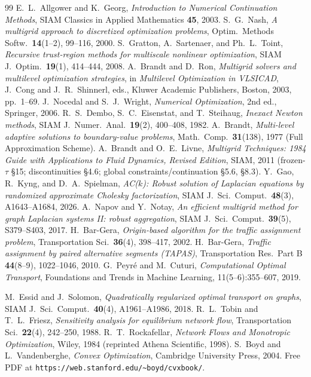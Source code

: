 \documentclass{siamart220329}
\begin{document}
\begin{thebibliography}{99}
 E.~L.~Allgower and K.~Georg, \emph{Introduction to Numerical Continuation
Methods}, SIAM Classics in Applied Mathematics \textbf{45}, 2003.
 S.~G.~Nash, \emph{A multigrid approach to discretized optimization problems},
Optim.\ Methods Softw.\ \textbf{14}(1--2), 99--116, 2000.
 S.~Gratton, A.~Sartenaer, and Ph.~L.~Toint, \emph{Recursive trust-region
methods for multiscale nonlinear optimization}, SIAM J.\ Optim.\ \textbf{19}(1), 414--444, 2008.
 A.~Brandt and D.~Ron, \emph{Multigrid solvers and multilevel optimization
strategies}, in \emph{Multilevel Optimization in VLSICAD}, J.~Cong and J.~R.~Shinnerl, eds.,
Kluwer Academic Publishers, Boston, 2003, pp.~1--69.
 J.~Nocedal and S.~J.~Wright, \emph{Numerical Optimization}, 2nd ed.,
Springer, 2006.
 R.~S.~Dembo, S.~C.~Eisenstat, and T.~Steihaug, \emph{Inexact Newton methods},
SIAM J.\ Numer.\ Anal.\ \textbf{19}(2), 400--408, 1982.
 A.~Brandt, \emph{Multi-level adaptive solutions to boundary-value problems},
Math.\ Comp.\ \textbf{31}(138), 1977 (Full Approximation Scheme).
 A.~Brandt and O.~E.~Livne, \emph{Multigrid Techniques: 1984 Guide with
Applications to Fluid Dynamics, Revised Edition}, SIAM, 2011 (frozen-$\tau$ \S15; discontinuities
\S4.6; global constraints/continuation \S5.6, \S8.3).
 Y.~Gao, R.~Kyng, and D.~A.~Spielman, \emph{AC($k$): Robust solution of
Laplacian equations by randomized approximate Cholesky factorization}, SIAM J.\ Sci.\ Comput.\
\textbf{48}(3), A1643--A1684, 2026.
 A.~Napov and Y.~Notay, \emph{An efficient multigrid method for graph Laplacian
systems II: robust aggregation}, SIAM J.\ Sci.\ Comput.\ \textbf{39}(5), S379--S403, 2017.
\bibitem{bargera2002} H.~Bar-Gera, \emph{Origin-based algorithm for the traffic assignment problem},
Transportation Sci.\ \textbf{36}(4), 398--417, 2002.
 H.~Bar-Gera, \emph{Traffic assignment by paired alternative segments (TAPAS)},
Transportation Res.\ Part B \textbf{44}(8--9), 1022--1046, 2010.
\bibitem{peyre-cuturi} G.~Peyr\'e and M.~Cuturi, \emph{Computational Optimal Transport}, Foundations and Trends in Machine Learning, 11(5--6):355--607, 2019.

 M.~Essid and J.~Solomon, \emph{Quadratically regularized optimal transport on
graphs}, SIAM J.\ Sci.\ Comput.\ \textbf{40}(4), A1961--A1986, 2018.
\bibitem{tobin-friesz} R.~L.~Tobin and T.~L.~Friesz, \emph{Sensitivity analysis for equilibrium network
flow}, Transportation Sci.\ \textbf{22}(4), 242--250, 1988.
 R.~T.~Rockafellar, \emph{Network Flows and Monotropic Optimization},
Wiley, 1984 (reprinted Athena Scientific, 1998).
 S.~Boyd and L.~Vandenberghe, \emph{Convex Optimization}, Cambridge
University Press, 2004. Free PDF at \texttt{https://web.stanford.edu/\textasciitilde boyd/cvxbook/}.
\end{thebibliography}
\end{document}
